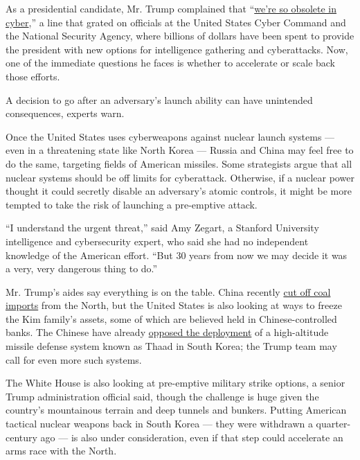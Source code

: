 As a presidential candidate, Mr. Trump complained that
``\href{https://www.nytimes.com/2016/03/27/us/politics/donald-trump-transcript.html?_r=0}{we're
so obsolete in cyber},'' a line that grated on officials at the United
States Cyber Command and the National Security Agency, where billions of
dollars have been spent to provide the president with new options for
intelligence gathering and cyberattacks. Now, one of the immediate
questions he faces is whether to accelerate or scale back those efforts.

A decision to go after an adversary's launch ability can have unintended
consequences, experts warn.

Once the United States uses cyberweapons against nuclear launch systems
--- even in a threatening state like North Korea --- Russia and China
may feel free to do the same, targeting fields of American missiles.
Some strategists argue that all nuclear systems should be off limits for
cyberattack. Otherwise, if a nuclear power thought it could secretly
disable an adversary's atomic controls, it might be more tempted to take
the risk of launching a pre-emptive attack.

``I understand the urgent threat,'' said Amy Zegart, a Stanford
University intelligence and cybersecurity expert, who said she had no
independent knowledge of the American effort. ``But 30 years from now we
may decide it was a very, very dangerous thing to do.''

Mr. Trump's aides say everything is on the table. China recently
\href{https://www.nytimes.com/2017/02/24/world/asia/china-north-korea-relations-kim-jong-un.html}{cut
off coal imports} from the North, but the United States is also looking
at ways to freeze the Kim family's assets, some of which are believed
held in Chinese-controlled banks. The Chinese have already
\href{https://www.nytimes.com/2016/07/08/world/asia/south-korea-and-us-agree-to-deploy-missile-defense-system.html}{opposed
the deployment} of a high-altitude missile defense system known as Thaad
in South Korea; the Trump team may call for even more such systems.

The White House is also looking at pre-emptive military strike options,
a senior Trump administration official said, though the challenge is
huge given the country's mountainous terrain and deep tunnels and
bunkers. Putting American tactical nuclear weapons back in South Korea
--- they were withdrawn a quarter-century ago --- is also under
consideration, even if that step could accelerate an arms race with the
North.

